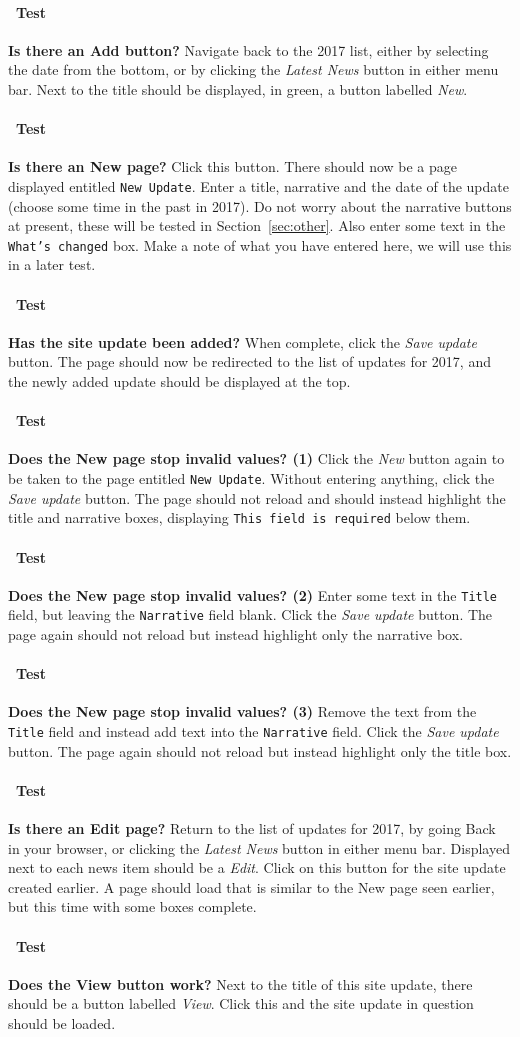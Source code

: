 \documentclass[12pt]{article}
\newcounter{Test}
\newcommand{\test}[1]{%
\stepcounter{Test}%
\paragraph{\Circle\ Test \theTest} \textbf{#1} }
\begin{document}
\test{Is there an Add button?}
Navigate back to the 2017 list, either by selecting the date from the bottom, or by clicking the \textit{Latest News} button in either menu bar. Next to the title should be displayed, in green, a button labelled \textit{New}.

\test{Is there an New page?}
Click this button. There should now be a page displayed entitled \texttt{New Update}. Enter a title, narrative and the date of the update (choose some time in the past in 2017). Do not worry about the narrative buttons at present, these will be tested in Section~\ref{sec:other}. Also enter some text in the \texttt{What's changed} box. Make a note of what you have entered here, we will use this in a later test.

\test{Has the site update been added?}
When complete, click the \textit{Save update} button. The page should now be redirected to the list of updates for 2017, and the newly added update should be displayed at the top.

\test{Does the New page stop invalid values? (1)}
Click the \textit{New} button again to be taken to the page entitled \texttt{New Update}. Without entering anything, click the \textit{Save update} button. The page should not reload and should instead highlight the title and narrative boxes, displaying \texttt{This field is required} below them.

\test{Does the New page stop invalid values? (2)}
Enter some text in the \texttt{Title} field, but leaving the \texttt{Narrative} field blank. Click the \textit{Save update} button. The page again should not reload but instead highlight only the narrative box.

\test{Does the New page stop invalid values? (3)}
Remove the text from the \texttt{Title} field and instead add text into the \texttt{Narrative} field. Click the \textit{Save update} button. The page again should not reload but instead highlight only the title box.

\test{Is there an Edit page?}
Return to the list of updates for 2017, by going Back in your browser, or clicking the \textit{Latest News} button in either menu bar. Displayed next to each news item should be a \textit{Edit}. Click on this button for the site update created earlier. A page should load that is similar to the New page seen earlier, but this time with some boxes complete.

\test{Does the View button work?}
Next to the title of this site update, there should be a button labelled \textit{View}. Click this and the site update in question should be loaded.
\end{document}
